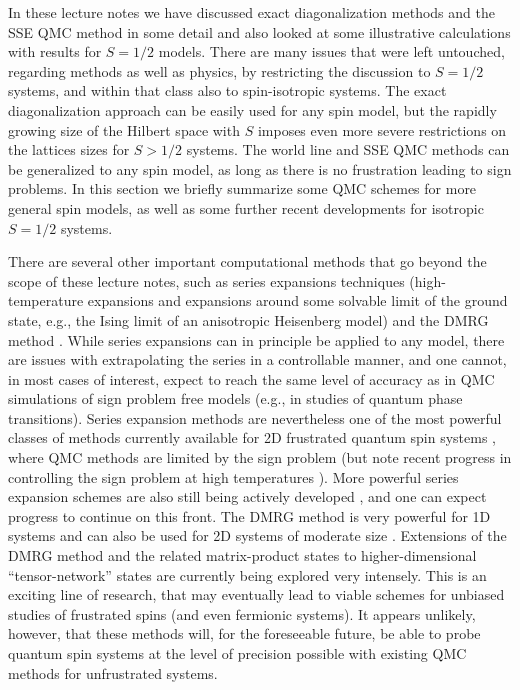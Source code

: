 \documentclass[draft,numberedheadings]{aipproc}
\begin{document}
In these lecture notes we have discussed exact diagonalization methods and the SSE QMC method in some detail and also looked 
at some illustrative calculations with results for $S=1/2$ models. There are many issues that were left untouched, regarding 
methods as well as physics, by restricting the discussion to $S=1/2$ systems, and within that class also to spin-isotropic 
systems. The exact diagonalization approach can be easily used for any spin model, but the rapidly growing size of the Hilbert 
space with $S$ imposes even more severe restrictions on the lattices sizes for $S>1/2$ systems. The world line and SSE QMC methods 
can be generalized to any spin model, as long as there is no frustration leading to sign problems. In this section we briefly 
summarize some QMC schemes for more general spin models, as well as some further recent developments for isotropic $S=1/2$ systems. 

There are several other important computational methods that go beyond the scope of these lecture notes, such as series 
expansions techniques (high-temperature expansions and expansions around some solvable limit of the ground state, 
e.g., the Ising limit of an anisotropic Heisenberg model) \cite{domb,oitmaabook} and the DMRG method \cite{white1,schollwock2}. 
While series expansions can in principle be applied to any model, there are issues with extrapolating the series in a controllable 
manner, and one cannot, in most cases of interest, expect to reach the same level of accuracy as in QMC simulations of sign problem 
free models (e.g., in studies of quantum phase transitions). Series expansion methods are nevertheless one of the most powerful 
classes of methods currently available for 2D frustrated quantum spin systems \cite{singh}, where QMC methods are limited by the sign 
problem (but note recent progress in controlling the sign problem at high temperatures \cite{nyfeler08}). More powerful series 
expansion schemes are also still being actively developed \cite{rigol07}, and one can expect progress to continue on this front. 
The DMRG method is very powerful for 1D systems and can also be used for 2D systems of moderate size \cite{chernyshev}. Extensions 
of the DMRG method and the related matrix-product states \cite{aklt,ostlund95,verstraete1} to higher-dimensional 
``tensor-network'' states \cite{verstraete1,murg1,vidal07} are currently being explored very intensely. This is an exciting line 
of research, that may eventually lead to viable schemes for unbiased studies of frustrated spins (and even fermionic systems). 
It appears unlikely, however, that these methods will, for the foreseeable future, be able to probe quantum spin systems at the 
level of precision possible with existing QMC methods for unfrustrated systems. 
\end{document}

